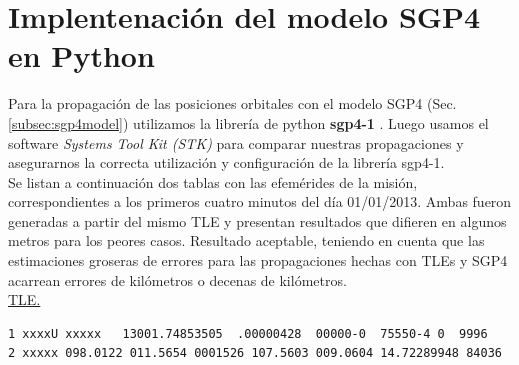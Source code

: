 \section{Implentenaci\'on del modelo SGP4 en Python}

Para la propagaci\'on de las posiciones orbitales con el modelo SGP4 (Sec. \ref{subsec:sgp4model}) utilizamos la librer\'ia de python {\bf{sgp4-1}} \citep{sgp4python}.
Luego usamos el software {\it{Systems Tool Kit (STK)}} \citep{stk} para comparar nuestras propagaciones y asegurarnos la correcta utilizaci\'on y configuraci\'on de la librer\'ia sgp4-1.\\

Se listan a continuaci\'on dos tablas con las efem\'erides de la misi\'on, correspondientes a los primeros cuatro minutos del d\'ia 01/01/2013.
Ambas fueron generadas a partir del mismo TLE y presentan resultados que difieren en algunos metros para los peores casos. Resultado aceptable, teniendo en cuenta que las estimaciones groseras de errores para las propagaciones hechas con TLEs y SGP4 acarrean errores de kil\'ometros o decenas de kil\'ometros.\\

\underline{TLE.}
{\small
\begin{verbatim}
1 xxxxU xxxxx   13001.74853505  .00000428  00000-0  75550-4 0  9996
2 xxxxx 098.0122 011.5654 0001526 107.5603 009.0604 14.72289948 84036
\end{verbatim}}


\begin{table}[!h]
\centering
{}
\caption{Resultados que genera ARxCODE utilizando la librer\'ia sgp4 de python para la propagaci\'on.}
\end{table}

